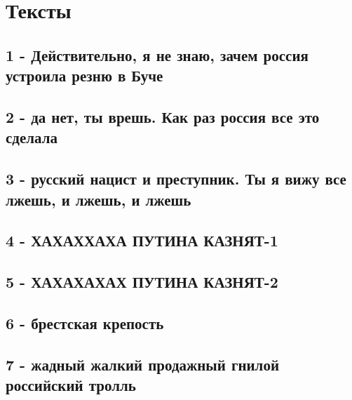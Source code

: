  
 
 
 
 

\section{Тексты}


\subsection{1 - Действительно, я не знаю, зачем россия устроила резню в Буче}

\subsection{2 - да нет, ты врешь. Как раз россия все это сделала}

\subsection{3 - русский нацист и преступник. Ты я вижу все лжешь, и лжешь, и лжешь}

\subsection{4 - ХАХАХХАХА ПУТИНА КАЗНЯТ-1}

\subsection{5 - ХАХАХАХАХ ПУТИНА КАЗНЯТ-2}

\subsection{6 - брестская крепость}

\subsection{7 - жадный жалкий продажный гнилой российский тролль}

